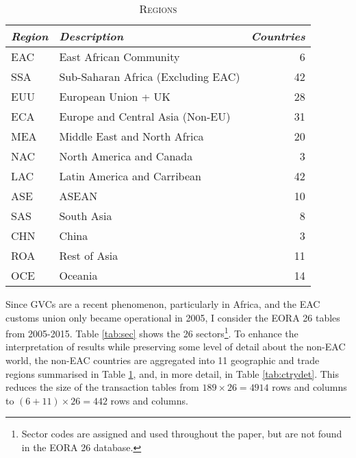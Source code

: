 \documentclass[a4paper]{article}
\begin{document}
\begin{table}[h!]
\centering
\caption{\textsc{Regions}}

\label{tab:ctry}
\vspace{2mm}
\begin{tabular}{llr} \toprule
\textit{Region} & \textit{Description} & \textit{Countries} \\ \midrule
EAC & East African Community & 6 \\
SSA & Sub-Saharan Africa (Excluding EAC) & 42 \\
EUU & European Union + UK & 28 \\
ECA & Europe and Central Asia (Non-EU) & 31 \\
MEA & Middle East and North Africa & 20 \\
NAC & North America and Canada & 3\\
LAC & Latin America and Carribean & 42 \\
ASE & ASEAN & 10 \\
SAS & South Asia & 8 \\
CHN & China & 3 \\
ROA & Rest of Asia & 11 \\
OCE & Oceania & 14
 \\ \bottomrule
\end{tabular}
\end{table}
\FloatBarrier

Since GVCs are a recent phenomenon, particularly in Africa, and the EAC customs union only became operational in 2005, %
I consider the EORA 26 tables from 2005-2015.  Table \ref{tab:sec} shows the 26 sectors\footnote{Sector codes are assigned and used throughout the paper, but are not found in the EORA 26 database.}. To enhance the interpretation of results while preserving some level of detail about the non-EAC world, %
the non-EAC countries are aggregated into 11 geographic and trade regions summarised in Table \ref{tab:ctry}, and, in more detail, in Table \ref{tab:ctrydet}. This reduces the size of the transaction tables from $189 \times 26 = 4914$ rows and columns to $(6 + 11)\times 26 = 442$ rows and columns. %
\end{document}
